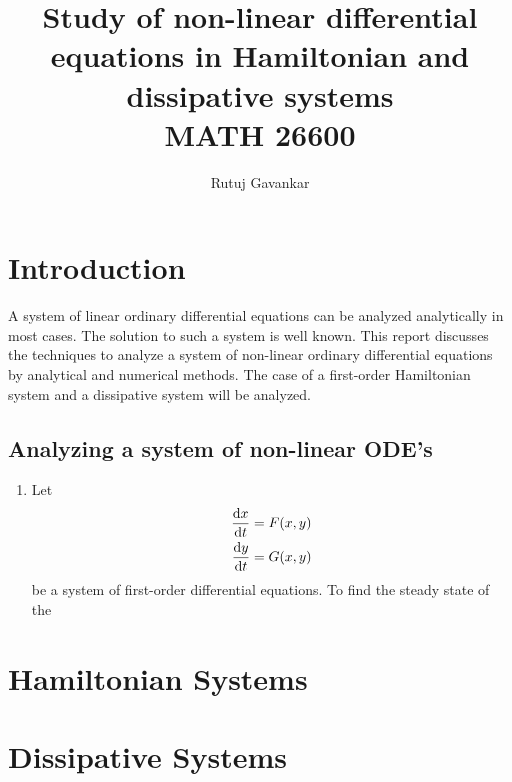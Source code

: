 \documentclass[12pt,1in]{article}
\title{Study of non-linear differential equations in Hamiltonian and dissipative systems \\ {\small MATH 26600}}
\author{Rutuj Gavankar}
\date{}
\begin{document}
\maketitle

\section{Introduction}
A system of linear ordinary differential equations can be analyzed analytically in most cases. The solution to such a system is well known. This report discusses the techniques to analyze a system of non-linear ordinary differential equations by analytical and numerical methods. The case of a first-order Hamiltonian system and a dissipative system will be analyzed.
\subsection{Analyzing a system of non-linear ODE's }
\begin{enumerate}
\item 
Let 
\begin{align}
\derivative{x}{t} &= F(x, y) \\
\derivative{y}{t} &= G(x , y)
\end{align}
be a system of first-order differential equations. To find the steady state of the 

\end{enumerate}
\section{Hamiltonian Systems}
\section{Dissipative Systems}


\end{document}

